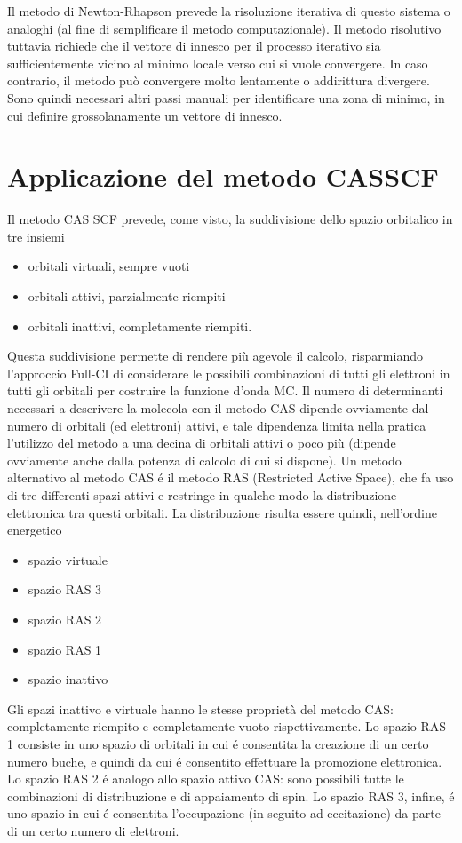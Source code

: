 Il metodo di Newton-Rhapson prevede la risoluzione iterativa di questo
sistema o analoghi (al fine di semplificare il metodo computazionale).
Il metodo risolutivo tuttavia richiede che il vettore di innesco per il
processo iterativo sia sufficientemente vicino al minimo locale verso
cui si vuole convergere. In caso contrario, il metodo pu\`o convergere
molto lentamente o addirittura divergere. Sono quindi necessari altri
passi manuali per identificare una zona di minimo, in cui definire
grossolanamente un vettore di innesco.

\section{Applicazione del metodo CASSCF}

Il metodo CAS SCF prevede, come visto, la suddivisione dello spazio
orbitalico in tre insiemi
\begin{itemize}
\item orbitali virtuali, sempre vuoti
\item orbitali attivi, parzialmente riempiti
\item orbitali inattivi, completamente riempiti.
\end{itemize}
Questa suddivisione permette di rendere pi\`u agevole il calcolo,
risparmiando l'approccio Full-CI di considerare le possibili
combinazioni di tutti gli elettroni in tutti gli orbitali per costruire
la funzione d'onda MC.
Il numero di determinanti necessari a descrivere la molecola con il
metodo CAS dipende ovviamente dal numero di orbitali (ed elettroni)
attivi, e tale dipendenza limita nella pratica l'utilizzo del metodo a 
una decina di orbitali attivi o poco pi\`u (dipende ovviamente anche dalla
potenza di calcolo di cui si dispone).
Un metodo alternativo al metodo CAS \'e il metodo RAS (Restricted Active
Space), che fa uso di tre differenti spazi attivi e restringe in qualche
modo la distribuzione elettronica tra questi orbitali. La distribuzione
risulta essere quindi, nell'ordine energetico
\begin{itemize}
\item spazio virtuale
\item spazio RAS 3
\item spazio RAS 2
\item spazio RAS 1
\item spazio inattivo
\end{itemize}

Gli spazi inattivo e virtuale hanno le stesse propriet\`a del metodo CAS:
completamente riempito e completamente vuoto rispettivamente.
Lo spazio RAS 1 consiste in uno spazio di orbitali in cui \'e consentita
la creazione di un certo numero buche, e quindi da cui \'e consentito
effettuare la promozione elettronica.
Lo spazio RAS 2 \'e analogo allo spazio attivo CAS: sono possibili tutte
le combinazioni di distribuzione e di appaiamento di spin.
Lo spazio RAS 3, infine, \'e uno spazio in cui \'e consentita
l'occupazione (in seguito ad eccitazione) da parte di un certo numero 
di elettroni.

